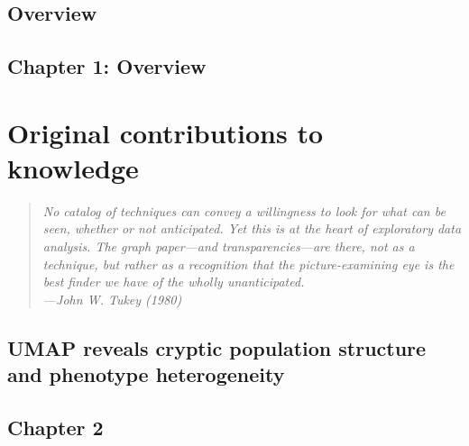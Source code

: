 \documentclass[12pt, TexShade, letterpaper]{report}
\makeatletter
\newcommand{\unchapter}[1]{%
  \begingroup
  \let\@makechapterhead\@gobble %
  \chapter{#1}
  \endgroup
}
\makeatother
\begin{document}
\vfill
\hspace{0pt}
\pagebreak

\unchapter{Overview}
\chapter*{Chapter 1: Overview}


%
%

\part{Original contributions to knowledge}
\label{part:manuscripts}

\pagebreak
\hspace{0pt}
\vfill

\begin{center}
\begin{quote} 
\begin{singlespace}
\textit{No catalog of techniques can convey a willingness to look for what can be seen, whether or not anticipated. Yet this is at the heart of exploratory data analysis. The graph paper---and transparencies---are there, not as a technique, but rather as a recognition that the picture-examining eye is the best finder we have of the wholly unanticipated. \\
---John W. Tukey (1980)}
\end{singlespace}
\end{quote}
\end{center}

\vfill
\hspace{0pt}
\pagebreak


\begin{refsection}
\unchapter{UMAP reveals cryptic population structure and phenotype heterogeneity}
\chapter*{Chapter 2}
\label{chap:chapter2}


\cleardoublepage
{}
\begin{singlespace}
\printbibliography[heading=subbibintoc]
\end{singlespace}
\end{refsection}
\end{document}
